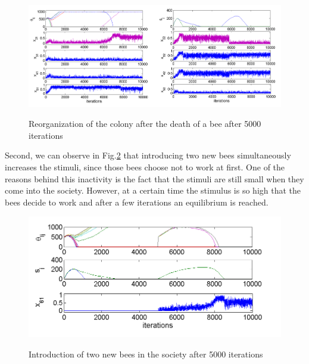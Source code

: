 \begin{figure}
\begin{centering}
\includegraphics[scale=0.4]{figures/Figure4.png}
\label{fig:figure6}
\par\end{centering}

\centering{}\caption{Reorganization of the colony after the death of a bee after 5000 iterations}
\end{figure}


Second, we can observe in Fig.\ref{fig:figure7} that introducing two new bees
simultaneously increases the stimuli, since those bees choose not
to work at first. One of the reasons behind this inactivity is the
fact that the stimuli are still small when they come into the society.
However, at a certain time the stimulus is so high that the bees decide
to work and after a few iterations an equilibrium is reached.

\begin{figure}[ht!]
\begin{centering}
\includegraphics[scale=0.8]{figures/Figure5.png}
\label{fig:figure7}
\par\end{centering}

\centering{}\caption{Introduction of two new bees in the society after 5000 iterations}
\end{figure}


